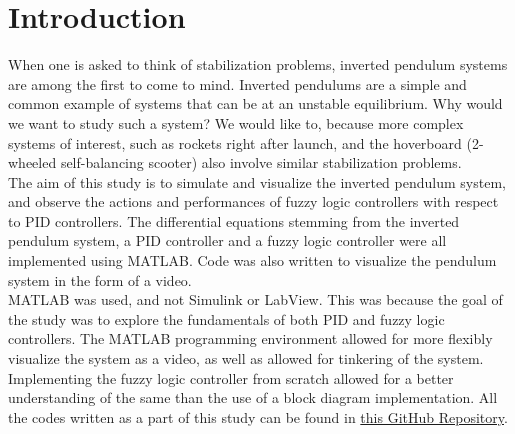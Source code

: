 \section{Introduction}

When one is asked to think of stabilization problems, inverted pendulum systems are among the first to come to mind. Inverted pendulums are a simple and common example of systems that can be at an unstable equilibrium. Why would we want to study such a system? We would like to, because more complex systems of interest, such as rockets right after launch, and the hoverboard (2-wheeled self-balancing scooter) also involve similar stabilization problems. \\

The aim of this study is to simulate and visualize the inverted pendulum system, and observe the actions and performances of fuzzy logic controllers with respect to PID controllers. The differential equations stemming from the inverted pendulum system, a PID controller and a fuzzy logic controller were all implemented using MATLAB. Code was also written to visualize the pendulum system in the form of a video. \\

MATLAB was used, and not Simulink or LabView. This was because the goal of the study was to explore the fundamentals of both PID and fuzzy logic controllers. The MATLAB programming environment allowed for more flexibly visualize the system as a video, as well as allowed for tinkering of the system. Implementing the fuzzy logic controller from scratch allowed for a better understanding of the same than the use of a block diagram implementation. All the codes written as a part of this study can be found in \href{https://github.com/GitShanks14/Fuzzy-control-inverted-pendulum}{this GitHub Repository}. 